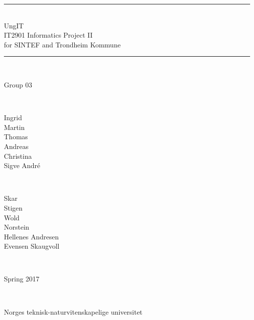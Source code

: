 \thispagestyle{empty}
\begin{center}

\noindent\rule{\textwidth}{1.3pt}
\\[1pc]
\Huge{UngIT}
\\[1pc]
\large{IT2901 Informatics Project II  \\for SINTEF and Trondheim Kommune}
\\[1pc]
\noindent\rule{\textwidth}{1.3pt}
\\[6pc]

\begin{bf}\Large{Group 03}\end{bf}
\\[1pc]

\begin{minipage}{0.3\textwidth}
	\begin{flushright} \large
		Ingrid\\
		Martin\\
		Thomas\\
		Andreas\\
        Christina\\
        Sigve André\\
	\end{flushright}
\end{minipage}~
    \begin{minipage}{0.3\textwidth}
	\begin{flushleft} \large
		Skar\\
		Stigen\\
		Wold\\
		Norstein\\
        Hellenes Andresen\\
        Evensen Skaugvoll\\
	\end{flushleft}
\end{minipage}
\\[4pc]


\begin{bf}
Spring 2017
\end{bf}
\\[8pc]


\begin{small}Norges teknisk-naturvitenskapelige universitet\end{small}

\end{center}

\pagebreak